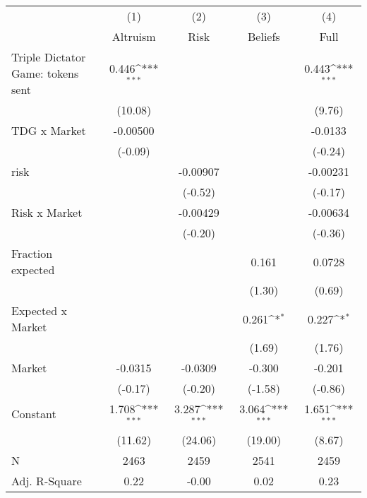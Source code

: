 {
\def\sym#1{\ifmmode^{#1}\else\(^{#1}\)\fi}
\begin{tabular}{l*{4}{c}}
\hline\hline
                    &\multicolumn{1}{c}{(1)}         &\multicolumn{1}{c}{(2)}         &\multicolumn{1}{c}{(3)}         &\multicolumn{1}{c}{(4)}         \\
                    &    Altruism         &        Risk         &     Beliefs         &        Full         \\
\hline
Triple Dictator Game: tokens sent&       0.446\sym{***}&                     &                     &       0.443\sym{***}\\
                    &     (10.08)         &                     &                     &      (9.76)         \\
[1em]
TDG x Market        &    -0.00500         &                     &                     &     -0.0133         \\
                    &     (-0.09)         &                     &                     &     (-0.24)         \\
[1em]
risk                &                     &    -0.00907         &                     &    -0.00231         \\
                    &                     &     (-0.52)         &                     &     (-0.17)         \\
[1em]
Risk x Market       &                     &    -0.00429         &                     &    -0.00634         \\
                    &                     &     (-0.20)         &                     &     (-0.36)         \\
[1em]
Fraction expected   &                     &                     &       0.161         &      0.0728         \\
                    &                     &                     &      (1.30)         &      (0.69)         \\
[1em]
Expected x Market   &                     &                     &       0.261\sym{*}  &       0.227\sym{*}  \\
                    &                     &                     &      (1.69)         &      (1.76)         \\
[1em]
Market              &     -0.0315         &     -0.0309         &      -0.300         &      -0.201         \\
                    &     (-0.17)         &     (-0.20)         &     (-1.58)         &     (-0.86)         \\
[1em]
Constant            &       1.708\sym{***}&       3.287\sym{***}&       3.064\sym{***}&       1.651\sym{***}\\
                    &     (11.62)         &     (24.06)         &     (19.00)         &      (8.67)         \\
\hline
N                   &        2463         &        2459         &        2541         &        2459         \\
Adj. R-Square       &        0.22         &       -0.00         &        0.02         &        0.23         \\
\hline\hline
\end{tabular}
}
